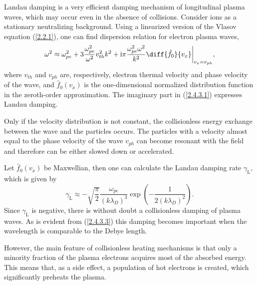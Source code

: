 Landau damping is a very efficient damping mechanism of longitudinal plasma waves, which may occur even in the absence of collisions. Consider ions as a stationary neutralizing background. Using a linearized version of the Vlasov equation (\ref{2.2.1}), one can find dispersion relation for electron plasma waves,
\begin{equation}
\label{2.4.3.1}
\omega^2 \approx \omega_{pe}^2 + 3 \frac{\omega_{pe}^2}{\omega^2} v_{th}^2 k^2 + \mathrm{i} \pi \frac{\omega_{pe}^2 \omega^2}{k^2} \diff{\hat{f}_{0}}{v_x}\bigg|_{v_x = v_{ph}},
\end{equation}
where $ v_{th} $ and $ v_{ph} $ are, respectively, electron thermal velocity and phase velocity of the wave, and $ \hat{f}_{0}(v_{x}) $ is the one-dimensional normalized distribution function in the zeroth-order approximation. The imaginary part in (\ref{2.4.3.1}) expresses Landau damping.

Only if the velocity distribution is not constant, the collisionless energy exchange between the wave and the particles occurs. The particles with a velocity almost equal to the phase velocity of the wave $ v_{ph} $ can become resonant with the field and therefore can be either slowed down or accelerated.

Let $ \hat{f}_{0}(v_{x}) $ be Maxwellian, then one can calculate the Landau damping rate $ \gamma_\mathrm{L} $, which is given by
\begin{equation}
\label{2.4.3.3}
\gamma_\mathrm{L} \approx -\sqrt{\frac{\pi}{2}} \frac{\omega_{pe}}{\left(k \lambda_D\right)^{3}} \exp \left(-\frac{1}{2 \left(k \lambda_D\right)^{2}}\right).
\end{equation}
Since $ \gamma_\mathrm{L} $ is negative, there is without doubt a collisionless damping of plasma waves. As is evident from (\ref{2.4.3.3}) this damping becomes important when the wavelength is comparable to the Debye length.

However, the main feature of collisionless heating mechanisms is that only a minority fraction of the plasma electrons acquires most of the absorbed energy. This means that, as a side effect, a population of hot electrons is created, which significantly preheats the plasma.

